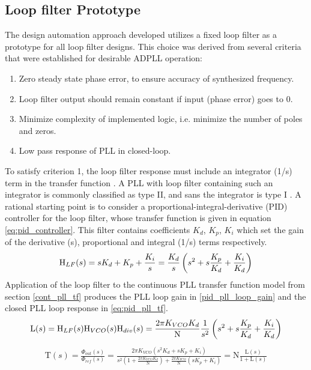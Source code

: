 \subsection{Loop filter Prototype}
	The design automation approach developed utilizes a fixed loop filter as a prototype for all loop filter designs. This choice was derived from several criteria that were established for desirable ADPLL operation:
	\begin{enumerate}[itemsep=0pt,label=\protect\mycirc{\arabic*}]
		\setlength\itemsep{-0.8em}
		\item Zero steady state phase error, to ensure accuracy of synthesized frequency.
		\item Loop filter output should remain constant if input (phase error) goes to 0.
		\item Minimize complexity of implemented logic, i.e. minimize the number of poles and zeros.
		\item Low pass response of PLL in closed-loop.
	\end{enumerate}
	To satisfy criterion 1, the loop filter response must include an integrator (1/s) term in the transfer function \cite{ogata_2010}. A PLL with loop filter containing such an integrator is commonly classified as type II, and sans the integrator is type I \cite{gardner_2005}. A rational starting point is to consider a proportional-integral-derivative (PID) controller \cite{ogata_2010_pid} for the loop filter, whose transfer function is given in equation \ref{eq:pid_controller}. This filter contains coefficients $K_d$, $K_p$, $K_i$ which set the gain of the derivative (s), proportional and integral (1/s) terms respectively. 
	\begin{equation}\label{eq:pid_controller}
		\textnormal{H}_{LF}(s) = sK_d + K_p + \frac{K_i}{s} = \frac{K_d}{s}\left(s^2 + s\frac{K_p}{K_d} + \frac{K_i}{K_d}\right)
	\end{equation}
	Application of the loop filter to the continuous PLL transfer function model from section \ref{cont_pll_tf} produces the PLL loop gain in \ref{pid_pll_loop_gain} and the closed PLL loop response in \ref{eq:pid_pll_tf}.
	\begin{equation} \label{pid_pll_loop_gain}
		\mathrm{L}(s) = \textnormal{H}_{LF}(s)\textnormal{H}_{VCO}(s)\textnormal{H}_{div}(s) = \frac{2\pi K_{VCO}K_d}{\mathrm{N}}\frac{1}{s^2}\left(s^2 + s\frac{K_p}{K_d} + \frac{K_i}{K_d}\right)
	\end{equation}
	\begin{align} \label{eq:pid_pll_tf}
		\mathrm{T}(s) = \frac{\Phi_{out}(s)}{\Phi_{ref}(s)} = \frac{2\pi K_{VCO}\left(s^2K_d + sK_p + K_i\right)}{s^2\left(1 + \frac{2\pi K_{VCO}K_d}{\mathrm{N}}\right) + \frac{2\pi K_{VCO}}{\mathrm{N}}\left(sK_p + K_i\right)} = \mathrm{N}\frac{\mathrm{L}(s)}{1 + \mathrm{L}(s)}
	\end{align}

